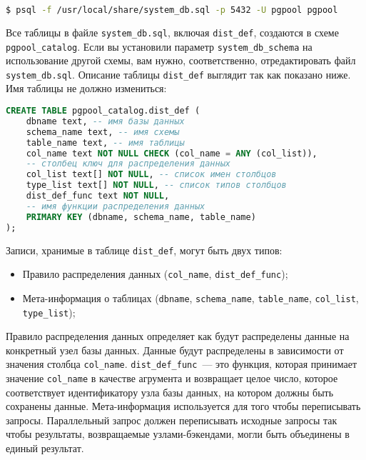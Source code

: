 \begin{lstlisting}[language=Bash,label=lst:pgpool30,caption=Создание таблицы dist\_def]
$ psql -f /usr/local/share/system_db.sql -p 5432 -U pgpool pgpool
\end{lstlisting}

Все таблицы в файле \lstinline!system_db.sql!, включая \lstinline!dist_def!, создаются в схеме \lstinline!pgpool_catalog!. Если вы установили параметр \lstinline!system_db_schema! на использование другой схемы, вам нужно, соответственно, отредактировать файл \lstinline!system_db.sql!. Описание таблицы \lstinline!dist_def! выглядит так как показано ниже. Имя таблицы не должно измениться:

\begin{lstlisting}[language=SQL,label=lst:pgpool31,caption=Создание таблицы dist\_def]
CREATE TABLE pgpool_catalog.dist_def (
    dbname text, -- имя базы данных
    schema_name text, -- имя схемы
    table_name text, -- имя таблицы
    col_name text NOT NULL CHECK (col_name = ANY (col_list)),
    -- столбец ключ для распределения данных
    col_list text[] NOT NULL, -- список имен столбцов
    type_list text[] NOT NULL, -- список типов столбцов
    dist_def_func text NOT NULL,
    -- имя функции распределения данных
    PRIMARY KEY (dbname, schema_name, table_name)
);
\end{lstlisting}

Записи, хранимые в таблице \lstinline!dist_def!, могут быть двух типов:

\begin{itemize}
  \item Правило распределения данных (\lstinline!col_name!, \lstinline!dist_def_func!);
  \item Мета-информация о таблицах (\lstinline!dbname!, \lstinline!schema_name!, \lstinline!table_name!, \lstinline!col_list!, \lstinline!type_list!);
\end{itemize}

Правило распределения данных определяет как будут распределены данные на конкретный узел базы данных. Данные будут распределены в зависимости от значения столбца \lstinline!col_name!. \lstinline!dist_def_func!~--- это функция, которая принимает значение \lstinline!col_name! в качестве агрумента и возвращает целое число, которое соответствует идентификатору узла базы данных, на котором должны быть сохранены данные. Мета-информация используется для того чтобы переписывать запросы. Параллельный запрос должен переписывать исходные запросы так чтобы результаты, возвращаемые узлами-бэкендами, могли быть объединены в единый результат.


